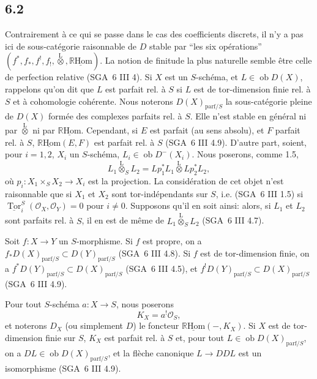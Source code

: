 \documentclass[11pt]{article}
\providecommand{\cO}{\mathcal{O}}
\DeclareMathOperator{\Tor}{Tor}
\newcommand{\R}{\mathbb{R}}\newcommand{\RHomCore}{\mathbb{R}\mathrm{Hom}}
\providecommand{\RHom}{\RHomCore}
\providecommand{\uRHom}{\underline{\RHom}}
\providecommand{\RHom}{\RHomCore}
\providecommand{\RHom}{\R\mathcal{H}om}
\providecommand{\R}{\mathrm R}
\providecommand{\RHom}{\RHomCore}
\begin{document}
\subsection*{6.2}
Contrairement à ce qui se passe dans le cas des coefficients discrets, il n'y a pas ici de sous-catégorie raisonnable de $D$ stable par ``les six opérations'' $(f^*,f_*,f^!,f_!,\overset{\mathrm{L}}{\otimes},\uRHom)$. La notion de finitude la plus naturelle semble être celle de perfection relative (SGA~6 III 4). Si $X$ est un $S$-schéma, et $L\in\operatorname{ob}D(X)$, 
rappelons qu'on dit que $L$ est parfait rel. à $S$ si $L$ est de tor-dimension finie rel. à $S$ et à
cohomologie cohérente. Nous noterons $D(X)_{\mathrm{parf}/S}$ la sous-catégorie pleine de $D(X)$ formée des complexes parfaits rel. à $S$. Elle n'est stable en général ni par $\overset{\mathrm{L}}{\otimes}$ ni par $\uRHom$. Cependant, si $E$ est parfait (au sens absolu), et $F$ parfait rel. à $S$, $\uRHom(E,F)$ est parfait rel. à $S$ (SGA~6 III 4.9). D'autre part, soient, pour $i=1,2$, $X_i$ un $S$-schéma, $L_i\in\operatorname{ob}D^{-}(X_i)$. Nous poserons, comme 1.5,
\[
L_1\overset{\mathrm{L}}{\otimes}_SL_2=Lp_1^*L_1\overset{\mathrm{L}}{\otimes}Lp_2^*L_2,
\]
où $p_i:X_1\times_SX_2\to X_i$ est la projection. La considération de cet objet n'est raisonnable que si $X_1$ et $X_2$ sont tor-indépendants sur $S$, i.e. (SGA~6 III 1.5) si $\underline{\Tor}_i^S(\cO_X,\cO_Y)=0$ pour $i\ne0$. Supposons qu'il en soit ainsi: alors, si $L_1$ et $L_2$ sont parfaits rel. à $S$, il en est de même de $L_1\overset{\mathrm{L}}{\otimes}_SL_2$ (SGA~6 III 4.7).

Soit $f:X\to Y$ un $S$-morphisme. Si $f$ est propre, on a $f_*D(X)_{\mathrm{parf}/S}\subset D(Y)_{\mathrm{parf}/S}$ (SGA~6 III 4.8). Si $f$ est de tor-dimension finie, on a $f^*D(Y)_{\mathrm{parf}/S}\subset D(X)_{\mathrm{parf}/S}$ (SGA~6 III 4.5), et $f^!D(Y)_{\mathrm{parf}/S}\subset D(X)_{\mathrm{parf}/S}$ (SGA~6 III 4.9).

Pour tout $S$-schéma $a:X\to S$, nous poserons
\begin{equation}
\tag{6.2.1}
K_X=a^!\cO_S,
\end{equation}
et noterons $D_X$ (ou simplement $D$) le foncteur $\uRHom(-,K_X)$. Si $X$ est de tor-dimension finie sur $S$, $K_X$ est parfait rel. à $S$ et, pour tout $L\in\operatorname{ob}D(X)_{\mathrm{parf}/S}$, on a $DL\in\operatorname{ob}D(X)_{\mathrm{parf}/S}$, et la flèche canonique $L\to DDL$ est un isomorphisme (SGA~6 III 4.9).
\end{document}
